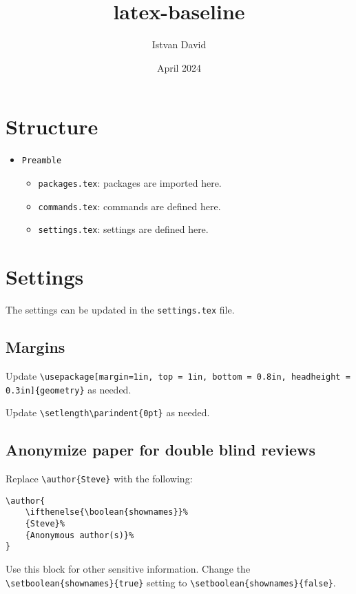 \documentclass{article}
\title{latex-baseline}
\author{Istvan David}
\date{April 2024}
\begin{document}


\maketitle

\section{Structure}
\begin{itemize}
    \item \verb|Preamble|
    \begin{itemize}
        \item \verb|packages.tex|: packages are imported here.
        \item \verb|commands.tex|: commands are defined here.
        \item \verb|settings.tex|: settings are defined here.
    \end{itemize}
\end{itemize}

\section{Settings}

The settings can be updated in the \verb|settings.tex| file.

\subsection{Margins}
Update \verb|\usepackage[margin=1in, top = 1in, bottom = 0.8in, headheight = 0.3in]{geometry}| as needed.

Update \verb|\setlength\parindent{0pt}| as needed.


\subsection{Anonymize paper for double blind reviews}
Replace \verb|\author{Steve}| with the following:
\begin{verbatim}
\author{
    \ifthenelse{\boolean{shownames}}%
    {Steve}%
    {Anonymous author(s)}%
}
\end{verbatim}

Use this block for other sensitive information. Change the \verb|\setboolean{shownames}{true}| setting to \verb|\setboolean{shownames}{false}|.
\end{document}
